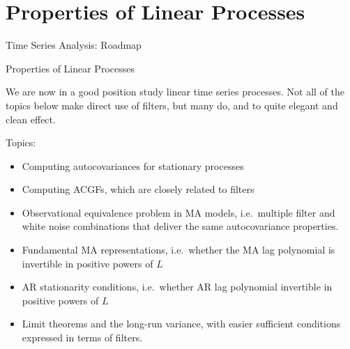\documentclass[aspectratio=169, handout]{beamer}
\begin{document}
\section{Properties of Linear Processes}

{\footnotesize
\begin{frame}{Time Series Analysis: Roadmap}
\end{frame}
}

{\footnotesize
\begin{frame}{Properties of Linear Processes}

We are now in a good position study linear time series processes.
Not all of the topics below make direct use of filters, but many do, and
to quite elegant and clean effect.

Topics:
\begin{itemize}
  \item Computing autocovariances for stationary processes
  \pause
  \item Computing \alert{ACGF}s, which are closely related to filters
  \pause
  \item Observational equivalence problem in MA models, i.e.\
    \alert{multiple} filter and white noise combinations that deliver
    the \alert{same} autocovariance properties.
  \item Fundamental MA representations, i.e.\ whether the MA lag
    polynomial is \alert{invertible in positive powers} of $L$
  \pause
  \item AR stationarity conditions, i.e.\ whether AR lag polynomial
    \alert{invertible in positive powers} of $L$
  \pause
  \item \alert{Limit theorems} and the \alert{long-run variance}, with
    easier sufficient conditions expressed in terms of filters.
\end{itemize}
\end{frame}
}




\end{document}
